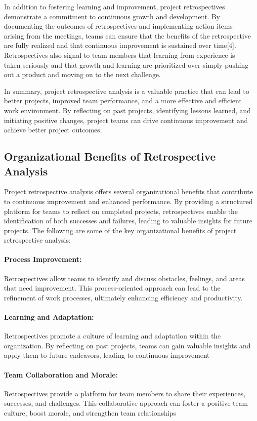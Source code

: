 \documentclass{article}
\begin{document}
In addition to fostering learning and improvement, project retrospectives demonstrate a commitment to continuous growth and development. By documenting the outcomes of retrospectives and implementing action items arising from the meetings, teams can ensure that the benefits of the retrospective are fully realized and that continuous improvement is sustained over time[4]. Retrospectives also signal to team members that learning from experience is taken seriously and that growth and learning are prioritized over simply pushing out a product and moving on to the next challenge. \cite{karlsson2006case} 

In summary, project retrospective analysis is a valuable practice that can lead to better projects, improved team performance, and a more effective and efficient work environment. By reflecting on past projects, identifying lessons learned, and initiating positive changes, project teams can drive continuous improvement and achieve better project outcomes.

\subsection{Organizational Benefits of Retrospective Analysis}
\noindent Project retrospective analysis offers several organizational benefits that contribute to continuous improvement and enhanced performance. By providing a structured platform for teams to reflect on completed projects, retrospectives enable the identification of both successes and failures, leading to valuable insights for future projects.
The following are some of the key organizational benefits of project retrospective analysis:
\paragraph*{Process Improvement:}Retrospectives allow teams to identify and discuss obstacles, feelings, and areas that need improvement. This process-oriented approach can lead to the refinement of work processes, ultimately enhancing efficiency and productivity. \cite{bjarnason2012evidence}
\paragraph*{Learning and Adaptation:}Retrospectives promote a culture of learning and adaptation within the organization. By reflecting on past projects, teams can gain valuable insights and apply them to future endeavors, leading to continuous improvement
\paragraph*{Team Collaboration and Morale:}Retrospectives provide a platform for team members to share their experiences, successes, and challenges. This collaborative approach can foster a positive team culture, boost morale, and strengthen team relationships
\end{document}
